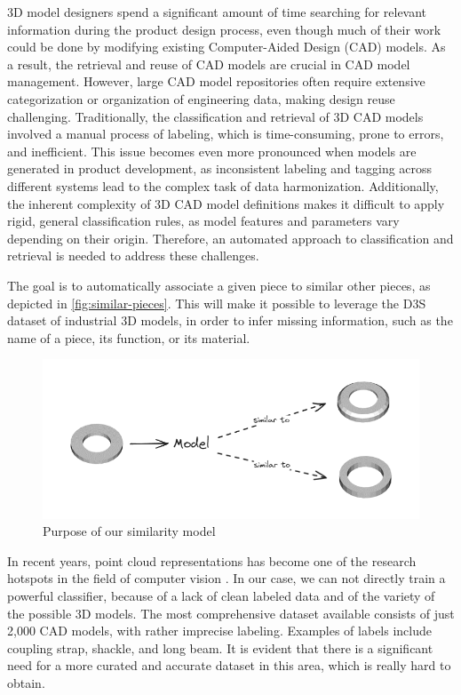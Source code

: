 3D model designers spend a significant amount of time searching for relevant information during the product design process, even though much of their work could be done by modifying existing Computer-Aided Design (CAD) models. As a result, the retrieval and reuse of CAD models are crucial in CAD model management. However, large CAD model repositories often require extensive categorization or organization of engineering data, making design reuse challenging. Traditionally, the classification and retrieval of 3D CAD models involved a manual process of labeling, which is time-consuming, prone to errors, and inefficient. This issue becomes even more pronounced when models are generated in product development, as inconsistent labeling and tagging across different systems lead to the complex task of data harmonization. Additionally, the inherent complexity of 3D CAD model definitions makes it difficult to apply rigid, general classification rules, as model features and parameters vary depending on their origin. Therefore, an automated approach to classification and retrieval is needed to address these challenges.

The goal is to automatically associate a given piece to similar other pieces, as depicted in \autoref{fig:similar-pieces}. This will make it possible to leverage the D3S dataset of industrial 3D models, in order to infer missing information, such as the name of a piece, its function, or its material.

\begin{figure}[]
    \centering
    \includegraphics[width=0.8\columnwidth]{images/similar-pieces.png}
    \caption{Purpose of our similarity model}
    \label{fig:similar-pieces}
\end{figure}

In recent years, point cloud representations has become one of the research hotspots in the field of computer vision \cite{zhangDeepLearningbased3D2023}.
In our case, we can not directly train a powerful classifier, because of a lack of clean labeled data and of the variety of the possible 3D models.
The most comprehensive dataset available consists of just 2,000 CAD models, with rather imprecise labeling. Examples of labels include coupling strap, shackle, and long beam. It is evident that there is a significant need for a more curated and accurate dataset in this area, which is really hard to obtain.

